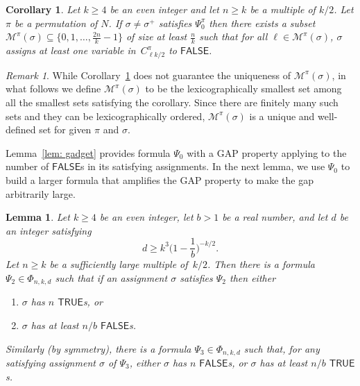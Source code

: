 \documentclass[11pt]{article}
\newtheorem{corollary}[theorem]{Corollary}
\newtheorem{lemma}[theorem]{Lemma}
\theoremstyle{definition}
\theoremstyle{remark}
\newtheorem*{remark}{Remark}
\def\TRUE{\mathsf{TRUE}}
\def\FALSE{\mathsf{FALSE}}
\begin{document}
  
\begin{corollary}\label{cor:CoverGadget}
Let $k\ge 4$ be an even integer and let $n\geq k$ be a multiple of $k/2$. 
Let $\pi$ be a permutation of $N$. 
If $\sigma \neq \sigma^+$ satisfies $\Psi_0^\pi$
then there exists a subset $\mathcal{M}^\pi(\sigma)\subseteq \{0,1,\dots, \frac{2n}{k}-1\}$ of size at least $\frac{n}{k}$ such that 
for all $\ell \in \mathcal{M}^\pi(\sigma)$, $\sigma$ assigns at least one variable in~$C^\pi_{\ell k/2}$ to $\FALSE$.
\end{corollary}
\begin{remark}
 While Corollary~\ref{cor:CoverGadget} does not guarantee the uniqueness of $\mathcal{M}^\pi(\sigma)$, in what follows we define $\mathcal{M}^\pi(\sigma)$ to be the lexicographically smallest set among all the smallest sets satisfying the corollary. Since there are finitely many such sets and they can be lexicographically ordered, $\mathcal{M}^\pi(\sigma)$ is a unique and well-defined set for given $\pi$ and $\sigma$.
\end{remark}

 

Lemma~\ref{lem: gadget} provides formula $\Psi_0$   with a GAP property applying to the number of $\FALSE$s in  its satisfying assignments. 
In the next lemma, we use  $\Psi_0$  to build a larger formula that amplifies the GAP property to make the gap arbitrarily large.
\begin{lemma} 
    \label{lem: large gadget}
Let $k\ge 4$ be an even integer, let $b>1$ be a real number, and let 
$d$
be an integer satisfying
 \[d\ge k^3\big(1-\frac{1}{b}\big)^{-k/2}.\] 
Let $n\geq k$ be a sufficiently large multiple of~$k/2$.
Then there is a formula $\Psi_2\in\Phi_{n,k,d}$ such that if an assignment $\sigma$ satisfies $\Psi_2$ then  either 
    \begin{enumerate}
        \item $\sigma$ has $n$ $\TRUE$s, or
        \item $\sigma$ has at least $n/b$ $\FALSE$s.  
    \end{enumerate}
    Similarly (by symmetry), there is a formula $\Psi_3 \in \Phi_{n,k,d}$ such that, for any satisfying assignment $\sigma$ of $\Psi_3$, either   $\sigma$ has $n$  $\FALSE$s, or $\sigma$ has at least $n/b$  $\TRUE$s.   
\end{lemma}
 
 
 
\end{document}
